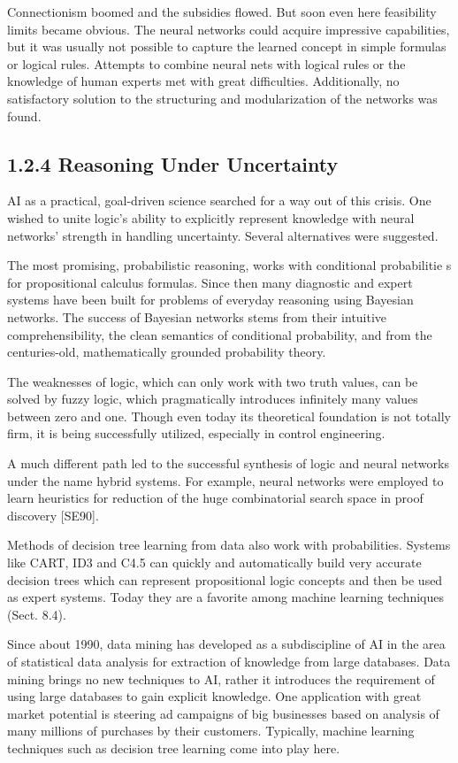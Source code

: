 \documentclass[10pt]{article}
\begin{document}
Connectionism boomed and the subsidies flowed. But soon even here feasibility limits became obvious. The neural networks could acquire impressive capabilities, but it was usually not possible to capture the learned concept in simple formulas or logical rules. Attempts to combine neural nets with logical rules or the knowledge of human experts met with great difficulties. Additionally, no satisfactory solution to the structuring and modularization of the networks was found.

\subsection*{1.2.4 Reasoning Under Uncertainty}
AI as a practical, goal-driven science searched for a way out of this crisis. One wished to unite logic's ability to explicitly represent knowledge with neural networks' strength in handling uncertainty. Several alternatives were suggested.

The most promising, probabilistic reasoning, works with conditional probabilitie
s for propositional calculus formulas. Since then many diagnostic and expert systems have been built for problems of everyday reasoning using Bayesian\\
networks. The success of Bayesian networks stems from their intuitive comprehensibility, the clean semantics of conditional probability, and from the centuries-old, mathematically grounded probability theory.

The weaknesses of logic, which can only work with two truth values, can be solved by fuzzy logic, which pragmatically introduces infinitely many values between zero and one. Though even today its theoretical foundation is not totally firm, it is being successfully utilized, especially in control engineering.

A much different path led to the successful synthesis of logic and neural networks under the name hybrid systems. For example, neural networks were employed to learn heuristics for reduction of the huge combinatorial search space in proof discovery [SE90].

Methods of decision tree learning from data also work with probabilities. Systems like CART, ID3 and C4.5 can quickly and automatically build very accurate decision trees which can represent propositional logic concepts and then be used as expert systems. Today they are a favorite among machine learning techniques (Sect. 8.4).

Since about 1990, data mining has developed as a subdiscipline of AI in the area of statistical data analysis for extraction of knowledge from large databases. Data mining brings no new techniques to AI, rather it introduces the requirement of using large databases to gain explicit knowledge. One application with great market potential is steering ad campaigns of big businesses based on analysis of many millions of purchases by their customers. Typically, machine learning techniques such as decision tree learning come into play here.
\end{document}
